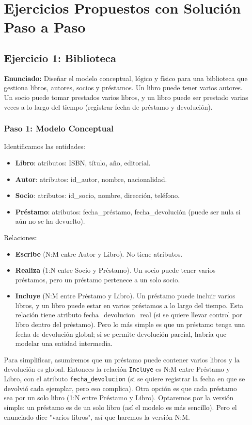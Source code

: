 \documentclass[12pt,a4paper,openany,oneside]{book}
\begin{document}
\chapter{Ejercicios Propuestos con Solución Paso a Paso}

\section{Ejercicio 1: Biblioteca}
\textbf{Enunciado:} Diseñar el modelo conceptual, lógico y físico para una biblioteca que gestiona libros, autores, socios y préstamos. Un libro puede tener varios autores. Un socio puede tomar prestados varios libros, y un libro puede ser prestado varias veces a lo largo del tiempo (registrar fecha de préstamo y devolución).

\subsection{Paso 1: Modelo Conceptual}
Identificamos las entidades:
\begin{itemize}
    \item \textbf{Libro}: atributos: ISBN, título, año, editorial.
    \item \textbf{Autor}: atributos: id\_autor, nombre, nacionalidad.
    \item \textbf{Socio}: atributos: id\_socio, nombre, dirección, teléfono.
    \item \textbf{Préstamo}: atributos: fecha\_préstamo, fecha\_devolución (puede ser nula si aún no se ha devuelto).
\end{itemize}
Relaciones:
\begin{itemize}
    \item \textbf{Escribe} (N:M entre Autor y Libro). No tiene atributos.
    \item \textbf{Realiza} (1:N entre Socio y Préstamo). Un socio puede tener varios préstamos, pero un préstamo pertenece a un solo socio.
    \item \textbf{Incluye} (N:M entre Préstamo y Libro). Un préstamo puede incluir varios libros, y un libro puede estar en varios préstamos a lo largo del tiempo. Esta relación tiene atributo fecha\_devolucion\_real (si se quiere llevar control por libro dentro del préstamo). Pero lo más simple es que un préstamo tenga una fecha de devolución global; si se permite devolución parcial, habría que modelar una entidad intermedia.
\end{itemize}
Para simplificar, asumiremos que un préstamo puede contener varios libros y la devolución es global. Entonces la relación \texttt{Incluye} es N:M entre Préstamo y Libro, con el atributo \texttt{fecha\_devolucion} (si se quiere registrar la fecha en que se devolvió cada ejemplar, pero eso complica). Otra opción es que cada préstamo sea por un solo libro (1:N entre Préstamo y Libro). Optaremos por la versión simple: un préstamo es de un solo libro (así el modelo es más sencillo). Pero el enunciado dice "varios libros", así que haremos la versión N:M.
\end{document}

